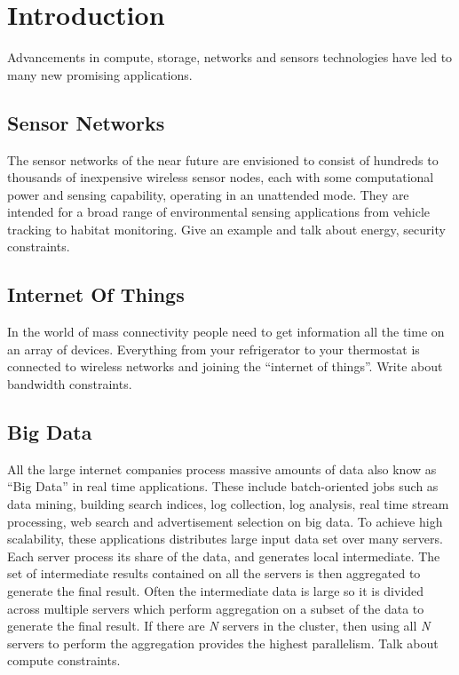 %
%
%


\chapter{Introduction}

	Advancements in compute, storage, networks and sensors technologies have led to many new promising applications. 

	\section{Sensor Networks}

		The sensor networks of the near future are envisioned
		to consist of hundreds to thousands of inexpensive
		wireless sensor nodes, each with some computational power
		and sensing capability, operating in an unattended mode.
		They are intended for a broad range of environmental sensing
		applications from vehicle tracking to habitat monitoring.
		Give an example and talk about energy, security constraints.

	\section{Internet Of Things}

		In the world of mass connectivity people need to get information all the time on an array of devices. Everything from your refrigerator to your thermostat is connected to wireless networks and joining the ``internet of things''. Write about bandwidth constraints.

	\section{Big Data}
		All the large internet companies process massive amounts of data also know as ``Big Data'' in real time applications.
		These include batch-oriented jobs such as data mining, building search indices, log collection, log analysis, real time stream processing, web search and advertisement selection on big data.
		To achieve high scalability, these applications distributes large input data set over many servers.
		Each server process its share of the data, and generates local intermediate.
		The set of intermediate results contained on all the servers is then aggregated to generate the final result.
		Often the intermediate data is large so it is divided across multiple servers which perform aggregation on a subset of the data to generate the final result. 
		If there are \emph{N} servers in the cluster, then using all \emph{N} servers to perform the aggregation provides the highest parallelism. Talk about compute constraints.
		\cite{Goossens:1994}
		

